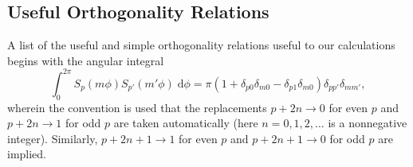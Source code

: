 \documentclass{article}
\begin{document}
\subsection{Useful Orthogonality Relations}\label{sec:simpleOrthogonality}

A list of the useful and simple orthogonality relations useful to our calculations begins with the angular integral
\begin{equation}
\int_0^{2\pi}S_p(m\phi)S_{p'}(m'\phi)\;\mathrm{d}\phi = \pi(1 + \delta_{p0}\delta_{m0} - \delta_{p1}\delta_{m0})\delta_{pp'}\delta_{mm'},
\end{equation}
wherein the convention is used that the replacements $p + 2n\to 0$ for even $p$ and $p + 2n\to1$ for odd $p$ are taken automatically (here $n = 0,1,2,\ldots$ is a nonnegative integer). Similarly, $p + 2n + 1\to 1$ for even $p$ and $p + 2n + 1\to0$ for odd $p$ are implied. 
\end{document}
